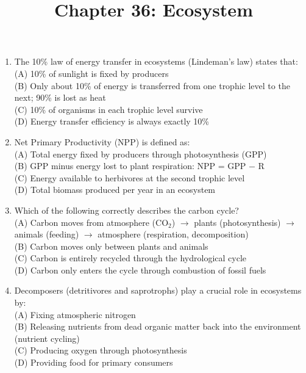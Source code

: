 \documentclass{article}
\begin{document}
\title{Chapter 36: Ecosystem}
\date{}
\maketitle

\begin{enumerate}[label=Q\arabic*.]

\item The 10\% law of energy transfer in ecosystems (Lindeman's law) states that:
\\(A) 10\% of sunlight is fixed by producers
\\(B) Only about 10\% of energy is transferred from one trophic level to the next; 90\% is lost as heat
\\(C) 10\% of organisms in each trophic level survive
\\(D) Energy transfer efficiency is always exactly 10\%

\item Net Primary Productivity (NPP) is defined as:
\\(A) Total energy fixed by producers through photosynthesis (GPP)
\\(B) GPP minus energy lost to plant respiration: NPP = GPP $-$ R
\\(C) Energy available to herbivores at the second trophic level
\\(D) Total biomass produced per year in an ecosystem

\item Which of the following correctly describes the carbon cycle?
\\(A) Carbon moves from atmosphere (CO$_2$) $\rightarrow$ plants (photosynthesis) $\rightarrow$ animals (feeding) $\rightarrow$ atmosphere (respiration, decomposition)
\\(B) Carbon moves only between plants and animals
\\(C) Carbon is entirely recycled through the hydrological cycle
\\(D) Carbon only enters the cycle through combustion of fossil fuels

\item Decomposers (detritivores and saprotrophs) play a crucial role in ecosystems by:
\\(A) Fixing atmospheric nitrogen
\\(B) Releasing nutrients from dead organic matter back into the environment (nutrient cycling)
\\(C) Producing oxygen through photosynthesis
\\(D) Providing food for primary consumers


\end{enumerate}
\end{document}
